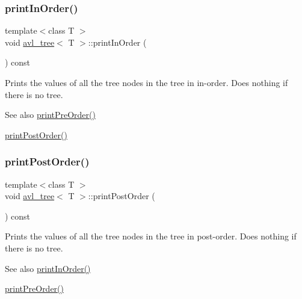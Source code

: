 \subsubsection{\texorpdfstring{print\+In\+Order()}{printInOrder()}}
{\footnotesize\ttfamily template$<$class T $>$ \\
void \hyperlink{classavl__tree}{avl\+\_\+tree}$<$ T $>$\+::print\+In\+Order (\begin{DoxyParamCaption}{ }\end{DoxyParamCaption}) const\hspace{0.3cm}{\ttfamily [inline]}}

Prints the values of all the tree nodes in the tree in in-\/order. Does nothing if there is no tree. \begin{DoxySeeAlso}{See also}
\hyperlink{classavl__tree_ac17fa1e4aa2f0f4b609a7b72c34bd2f6}{print\+Pre\+Order()} 

\hyperlink{classavl__tree_a5fb83061648947aeb6b540a5dee7ae13}{print\+Post\+Order()} 
\end{DoxySeeAlso}
\mbox{\label{classavl__tree_a5fb83061648947aeb6b540a5dee7ae13}} 
\subsubsection{\texorpdfstring{print\+Post\+Order()}{printPostOrder()}}
{\footnotesize\ttfamily template$<$class T $>$ \\
void \hyperlink{classavl__tree}{avl\+\_\+tree}$<$ T $>$\+::print\+Post\+Order (\begin{DoxyParamCaption}{ }\end{DoxyParamCaption}) const\hspace{0.3cm}{\ttfamily [inline]}}

Prints the values of all the tree nodes in the tree in post-\/order. Does nothing if there is no tree. \begin{DoxySeeAlso}{See also}
\hyperlink{classavl__tree_a524ae6ac5d7f7c2399fb758aba84af80}{print\+In\+Order()} 

\hyperlink{classavl__tree_ac17fa1e4aa2f0f4b609a7b72c34bd2f6}{print\+Pre\+Order()} 
\end{DoxySeeAlso}
\mbox{\label{classavl__tree_ac17fa1e4aa2f0f4b609a7b72c34bd2f6}} 
